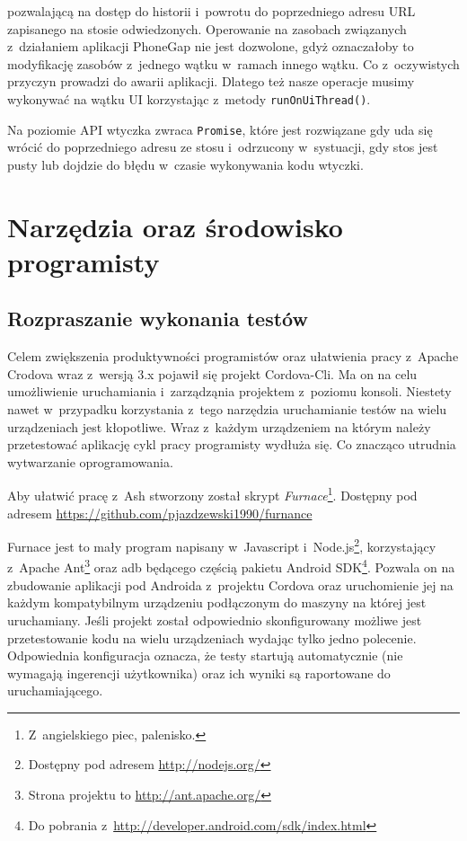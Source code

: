 \documentclass[brudnopis]{xmgr}
\begin{document}
pozwalającą na dostęp do historii i~powrotu do poprzedniego  adresu URL zapisanego na stosie odwiedzonych. Operowanie na zasobach związanych z~działaniem aplikacji PhoneGap nie jest dozwolone, gdyż oznaczałoby to modyfikację zasobów z~jednego wątku w~ramach innego wątku. Co z~oczywistych przyczyn prowadzi do awarii aplikacji. Dlatego też nasze operacje musimy wykonywać na wątku UI korzystając z~metody \texttt{runOnUiThread()}.

Na poziomie API wtyczka zwraca \texttt{Promise}, które jest rozwiązane gdy uda się wrócić do poprzedniego adresu ze stosu i~odrzucony w~systuacji, gdy stos jest pusty lub dojdzie do błędu w~czasie wykonywania kodu wtyczki.

\chapter{Narzędzia oraz środowisko programisty}

\section{Rozpraszanie wykonania testów}

Celem zwiększenia produktywności programistów oraz ułatwienia pracy z~Apache Crodova wraz z~wersją 3.x pojawił się projekt Cordova-Cli. Ma on na celu umożliwienie uruchamiania i~zarządząnia projektem z~poziomu konsoli. Niestety nawet w~przypadku korzystania z~tego narzędzia uruchamianie testów na wielu urządzeniach jest kłopotliwe. Wraz z~każdym urządzeniem na którym należy przetestować aplikację cykl pracy programisty wydłuża się. Co znacząco utrudnia wytwarzanie oprogramowania.

Aby ułatwić pracę z~Ash stworzony został skrypt \textit{Furnace}\footnote{Z~angielskiego piec, palenisko.}. Dostępny pod adresem \url{https://github.com/pjazdzewski1990/furnance}

Furnace jest to mały program napisany w~Javascript i~Node.js\footnote{Dostępny pod adresem \url{http://nodejs.org/} }, korzystający z~Apache Ant\footnote{Strona projektu to  \url{http://ant.apache.org/} } oraz adb będącego częścią pakietu Android SDK\footnote{Do pobrania z~\url{http://developer.android.com/sdk/index.html} }. Pozwala on na zbudowanie aplikacji pod Androida z~projektu Cordova oraz uruchomienie jej na każdym kompatybilnym urządzeniu podłączonym do maszyny na której jest uruchamiany. Jeśli projekt został odpowiednio skonfigurowany możliwe jest przetestowanie kodu na wielu urządzeniach wydając tylko jedno polecenie. Odpowiednia konfiguracja oznacza, że testy startują automatycznie (nie wymagają ingerencji użytkownika) oraz ich wyniki są raportowane do uruchamiającego. 
\end{document}
